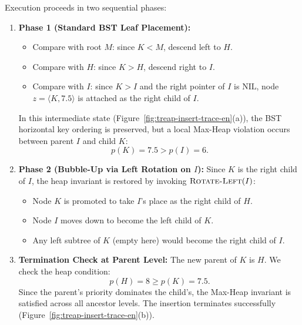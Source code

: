 Execution proceeds in two sequential phases:
\begin{enumerate}
    \item \textbf{Phase 1 (Standard BST Leaf Placement):}
    \begin{itemize}
        \item Compare with root $M$: since $K < M$, descend left to $H$.
        \item Compare with $H$: since $K > H$, descend right to $I$.
        \item Compare with $I$: since $K > I$ and the right pointer of $I$ is $\mathrm{NIL}$, node $z = \langle K, 7.5 \rangle$ is attached as the right child of $I$.
    \end{itemize}
    In this intermediate state (Figure~\ref{fig:treap-insert-trace-en}(a)), the BST horizontal key ordering is preserved, but a local Max-Heap violation occurs between parent $I$ and child $K$:
    \begin{equation}
      p(K) = 7.5 > p(I) = 6.
    \end{equation}
    
    \item \textbf{Phase 2 (Bubble-Up via Left Rotation on $I$):}
    Since $K$ is the right child of $I$, the heap invariant is restored by invoking $\textsc{Rotate-Left}(I)$:
    \begin{itemize}
        \item Node $K$ is promoted to take $I$'s place as the right child of $H$.
        \item Node $I$ moves down to become the left child of $K$.
        \item Any left subtree of $K$ (empty here) would become the right child of $I$.
    \end{itemize}
    \item \textbf{Termination Check at Parent Level:}
    The new parent of $K$ is $H$. We check the heap condition:
    \begin{equation}
      p(H) = 8 \ge p(K) = 7.5.
    \end{equation}
    Since the parent's priority dominates the child's, the Max-Heap invariant is satisfied across all ancestor levels. The insertion terminates successfully (Figure~\ref{fig:treap-insert-trace-en}(b)).
\end{enumerate}

